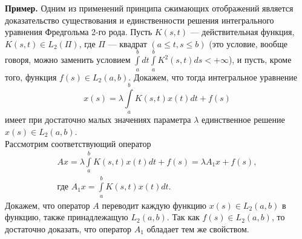 \documentclass[12pt,a4paper, titlepage]{article}
\begin{document}
\textbf{Пример.} Одним из применений принципа сжимающих отображений является доказательство существования и единственности решения интегрального уравнения Фредгольма 2-го рода. Пусть $K(s, t)$ --- действительная функция, $K(s, t) \in L_2(\Pi)$, где $\Pi$ --- квадрат $(a \leqslant t,s \leqslant b)$ (это условие, вообще говоря, можно заменить условием
$
\int\limits_a^b dt \int\limits_a^b K^2(s,t)ds < + \infty
$),
и пусть, кроме того, функция $f(s) \in L_2 (a, b)$. Докажем, что тогда интегральное уравнение 
$$
x(s) = \lambda \int\limits_a^b K(s,t)x(t) dt + f(s)
$$
имеет при достаточно малых значениях параметра $\lambda$ единственное решение $x(s) \in L_2(a, b)$.\\

Рассмотрим соответствующий оператор
\begin{multline*}
Ax = \lambda \int\limits_a^b K(s,t)x(t) dt + f(s) = \lambda A_1 x + f(s),\\
\text{где } A_1 x = \int\limits_a^b K(s,t)x(t) dt.
\end{multline*}
Докажем, что оператор $A$ переводит каждую функцию $x(s) \in L_2(a, b)$ в функцию, также принадлежащую $L_2(a, b)$. Так как $f(s) \in L_2 (a, b)$, то достаточно доказать, что оператор $A_1$ обладает тем же свойством.\\
\end{document}
